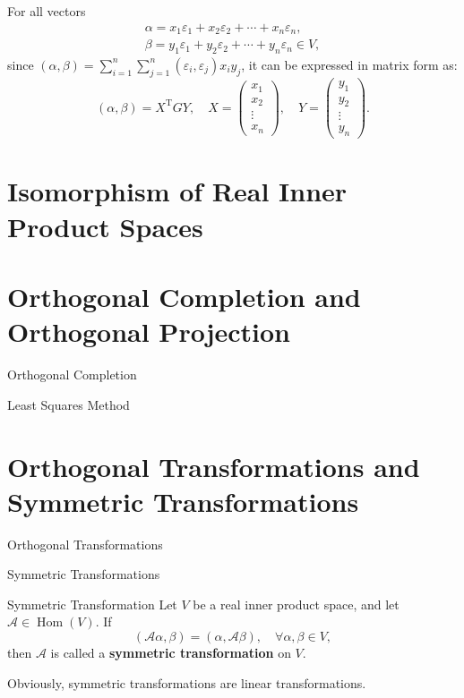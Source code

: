 \documentclass[11pt]{../../TexTemplate/elegantbook} %
\begin{document}
For all vectors
\begin{gather*}
    \alpha = x_{1}\varepsilon_{1}+x_{2}\varepsilon_{2}+\cdots+x_{n}\varepsilon_{n},  \\
    \beta = y_{1}\varepsilon_{1}+y_{2}\varepsilon_{2}+\cdots+y_{n}\varepsilon_{n} \in V ,
\end{gather*}
since \(( \alpha, \beta)=\sum_{i=1}^{n} \sum_{j=1}^{n}  (\varepsilon_i, \varepsilon_j)x_{i}y_{j} \), 
it can be expressed in matrix form as:
\[
( \alpha, \beta) = X^{\mathrm{T}} G Y, \quad
X = \begin{pmatrix} x_1 \\ x_2 \\ \vdots \\ x_n \end{pmatrix}, \quad
Y = \begin{pmatrix} y_1 \\ y_2 \\ \vdots \\ y_n \end{pmatrix}.
\]


\section{Isomorphism of Real Inner Product Spaces}

\section{Orthogonal Completion and Orthogonal Projection}
\begin{leftbarTitle}{Orthogonal Completion}\end{leftbarTitle}

\begin{leftbarTitle}{Least Squares Method}\end{leftbarTitle}


\section{Orthogonal Transformations and Symmetric Transformations}
\begin{leftbarTitle}{Orthogonal Transformations}\end{leftbarTitle}
\begin{leftbarTitle}{Symmetric Transformations}\end{leftbarTitle}
\begin{definition}{Symmetric Transformation}
    Let \( V \) be a real inner product space, 
    and let \( \mathcal{A}\in \operatorname{Hom}(V) \).
    If
    \[
    (\mathcal{A}\alpha, \beta) = (\alpha, \mathcal{A}\beta), \quad \forall \alpha, \beta \in V,
    \]
    then \( \mathcal{A} \) is called a \textbf{symmetric transformation} on \( V \).
\end{definition}
Obviously, symmetric transformations are linear transformations.
\end{document}
